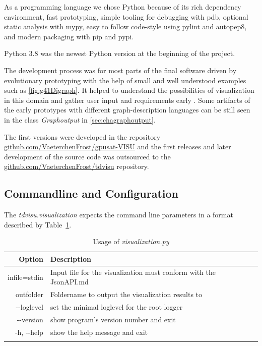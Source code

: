 \documentclass[a4paper, 12pt, bibliography=totoc]{scrartcl}
\begin{document}
As a programming language we chose Python because of its rich dependency environment, fast prototyping, simple tooling for debugging with pdb, optional static analysis with mypy, easy to follow code-style using pylint and autopep8, and modern packaging with pip and pypi.

Python 3.8 was the newest Python version at the beginning of the project. 

The development process was for most parts of the final software driven by evolutionary prototyping with the help of small and well understood examples such as \ref{fig:g41Digraph}. It helped to understand the possibilities of visualization in this domain and gather user input and requirements early \cite{rapidPrototypingOvermyer}. Some artifacts of the early prototypes with different graph-description languages can be still seen in the class \textit{Graphoutput} in \ref{sec:chagraphoutput}.

The first versions were developed in the repository \url{github.com/VaeterchenFrost/gpusat-VISU} and the first releases and later development of the source code was outsourced to the \url{github.com/VaeterchenFrost/tdvisu} repository.


\subsection{Commandline and Configuration}

The \textit{tdvisu.visualization} expects the command line parameters in a format described by Table~\ref{tab:optionstdvisu}.

\def\arraystretch{1.2}%

\begin{longtable}{|r|p{10cm}|}
	\hline
	Option & Description\\
	\hline\hline
	\endhead

	infile=stdin &  Input file for the visualization must conform with the JsonAPI.md\\
	outfolder &  Foldername to output the visualization results to\\
	-{}-loglevel  &   set the minimal loglevel for the root logger\\
	-{}-version & show program's version number and exit\\
	-h, -{}-help & show the help message and exit\\
	\hline\hline
	\caption{Usage of \textit{visualization.py}
		\label{tab:optionstdvisu}}
\end{longtable}
\end{document}
